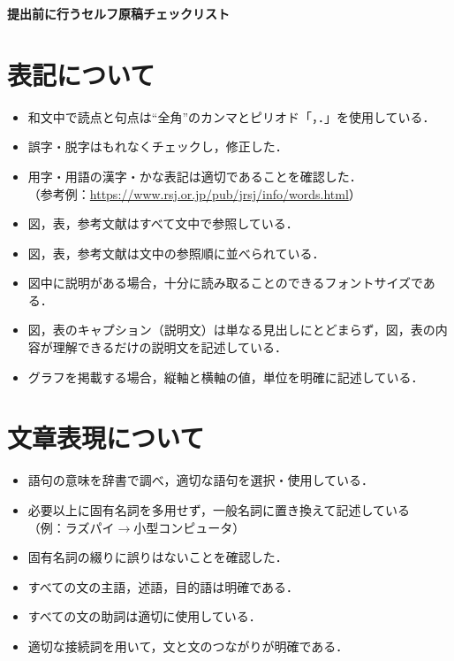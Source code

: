 \documentclass[a4paper,11pt,dvipdfmx]{jlreq}
\begin{document}
\begin{center}
\textbf{\Large
提出前に行うセルフ原稿チェックリスト %
}
\normalsize
\end{center}

\pagestyle{fancy}


\renewcommand{\labelitemi}{$\Box$}
\section{表記について}
\begin{itemize}
 \item 和文中で読点と句点は``全角''のカンマとピリオド「，．」を使用している．
 \item 誤字・脱字はもれなくチェックし，修正した．
 \item 用字・用語の漢字・かな表記は適切であることを確認した．\\
（参考例：\url{https://www.rsj.or.jp/pub/jrsj/info/words.html}）
 \item 図，表，参考文献はすべて文中で参照している．
 \item 図，表，参考文献は文中の参照順に並べられている．
 \item 図中に説明がある場合，十分に読み取ることのできるフォントサイズである．
 \item 図，表のキャプション（説明文）は単なる見出しにとどまらず，図，表の内容が理解できるだけの説明文を記述している．
 \item グラフを掲載する場合，縦軸と横軸の値，単位を明確に記述している．
 \end{itemize}

\section{文章表現について}
\begin{itemize}
 \item 語句の意味を辞書で調べ，適切な語句を選択・使用している．
 \item 必要以上に固有名詞を多用せず，一般名詞に置き換えて記述している\\ 
（例：ラズパイ$\rightarrow$小型コンピュータ）
 \item 固有名詞の綴りに誤りはないことを確認した．
 \item すべての文の主語，述語，目的語は明確である．
 \item すべての文の助詞は適切に使用している．
 \item 適切な接続詞を用いて，文と文のつながりが明確である．
\end{itemize}
\end{document}
